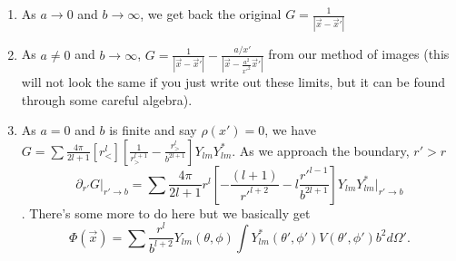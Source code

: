 \documentclass[a4paper,twoside,master.tex]{subfiles}
\begin{document}
\begin{enumerate}
\item As $a\to 0$ and $b\to\infty$, we get back the original
  $G=\frac{1}{|\vec{x}-\vec{x}'|}$
\item As $a\neq 0$ and $b\to\infty$, $G=\frac{1}{|\vec{x}-\vec{x}'|} - \frac{a/x'}{|\vec{x}-\frac{a^2}{x'^2}\vec{x}'|}$ from our method of images (this will not look the same if you just write out these limits, but it can be found through some careful algebra).
\item As $a=0$ and $b$ is finite and say $\rho(x')=0$, we have $G=\sum \frac{4\pi}{2l+1}[r_<^l]\left[\frac{1}{r_>^{l+1}}-\frac{r_>^l}{b^{2l+1}}\right]Y_{lm}Y_{lm}^*$. As we approach the boundary, $r'>r$ 
    \begin{equation}
        \partial_{r'}G\bigg|_{r'\to b} = \sum\frac{4\pi}{2l+1}r^l\left[-\frac{(l+1)}{r'^{l+2}}-l\frac{r'^{l-1}}{b^{2l+1}}\right]Y_{lm}Y_{lm}^*\bigg|_{r'\to b}
    \end{equation}. There's some more to do here but we basically get \begin{equation}
        \Phi(\vec{x}) = \sum\frac{r^l}{b^{l+2}}Y_{lm}(\theta,\phi)\int Y_{lm}^*(\theta',\phi')V(\theta',\phi')b^2d\Omega'.
    \end{equation}
\end{enumerate}
\end{document}
